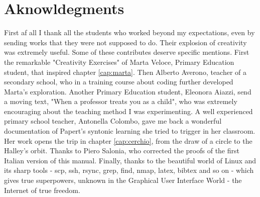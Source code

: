 \tableofcontents
\newpage

\section{Aknowldegments}

First af all I thank all the students who worked beyond my expectations, even by sending works that they were not supposed to do. Their explosion of creativity was extremely useful. Some of these contributes deserve specific mentions. First the remarkable "Creativity Exercises" of Marta Veloce, Primary Education student, that inspired chapter \ref{cap:marta}. Then Alberto Averono, teacher of a secondary school, who in a training course about coding further developed Marta's exploration. Another Primary Education student, Eleonora Aiazzi, send a moving text, "When a professor treats you as a child", who was extremely encouraging about the teaching method I was experimenting. A well experienced primary school teacher, Antonella Colombo, gave me back a wonderful documentation of Papert's syntonic learning she tried to trigger in her classroom. Her work opens the trip in chapter \ref{cap:cerchio}, from the draw of a circle to the Halley's orbit. Thanks to Piero Salonia, who corrected the proofs of the first Italian version of this manual. Finally, thanks to the beautiful world of Linux and its sharp tools  - scp, ssh, rsync, grep, find, nmap, latex, bibtex and so on - which gives true superpowers, unknown in the Graphical User Interface World - the Internet of true freedom.


